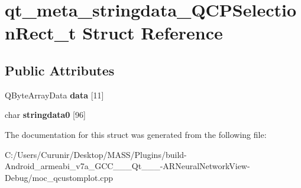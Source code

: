 \hypertarget{structqt__meta__stringdata___q_c_p_selection_rect__t}{}\section{qt\+\_\+meta\+\_\+stringdata\+\_\+\+Q\+C\+P\+Selection\+Rect\+\_\+t Struct Reference}
\label{structqt__meta__stringdata___q_c_p_selection_rect__t}
\subsection*{Public Attributes}
\begin{DoxyCompactItemize}
\item 
\mbox{\label{structqt__meta__stringdata___q_c_p_selection_rect__t_a3c91365b655c5d43c21dc9e1c92f8ea7}} 
Q\+Byte\+Array\+Data {\bfseries data} \mbox{[}11\mbox{]}
\item 
\mbox{\label{structqt__meta__stringdata___q_c_p_selection_rect__t_a74546e133456a9b71a541ec8412a5014}} 
char {\bfseries stringdata0} \mbox{[}96\mbox{]}
\end{DoxyCompactItemize}


The documentation for this struct was generated from the following file\+:\begin{DoxyCompactItemize}
\item 
C\+:/\+Users/\+Curunir/\+Desktop/\+M\+A\+S\+S/\+Plugins/build-\/\+Android\+\_\+armeabi\+\_\+v7a\+\_\+\+G\+C\+C\+\_\+\_\+\_\+\+Qt\+\_\+\_\+\_-\/\+A\+R\+Neural\+Network\+View-\/\+Debug/moc\+\_\+qcustomplot.\+cpp\end{DoxyCompactItemize}
